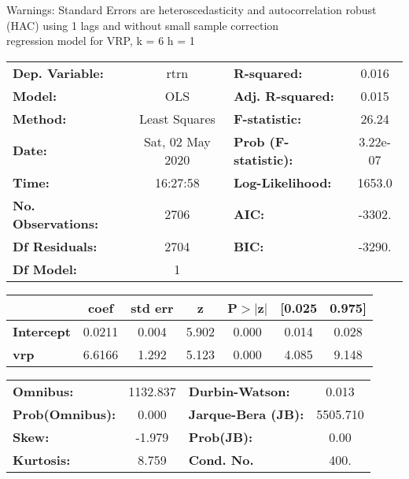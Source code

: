 Warnings: \newline
 [1] Standard Errors are heteroscedasticity and autocorrelation robust (HAC) using 1 lags and without small sample correction\\ 

regression model for VRP, k = 6 h = 1\begin{center}
\begin{tabular}{lclc}
\toprule
\textbf{Dep. Variable:}    &       rtrn       & \textbf{  R-squared:         } &     0.016   \\
\textbf{Model:}            &       OLS        & \textbf{  Adj. R-squared:    } &     0.015   \\
\textbf{Method:}           &  Least Squares   & \textbf{  F-statistic:       } &     26.24   \\
\textbf{Date:}             & Sat, 02 May 2020 & \textbf{  Prob (F-statistic):} &  3.22e-07   \\
\textbf{Time:}             &     16:27:58     & \textbf{  Log-Likelihood:    } &    1653.0   \\
\textbf{No. Observations:} &        2706      & \textbf{  AIC:               } &    -3302.   \\
\textbf{Df Residuals:}     &        2704      & \textbf{  BIC:               } &    -3290.   \\
\textbf{Df Model:}         &           1      & \textbf{                     } &             \\
\bottomrule
\end{tabular}
\begin{tabular}{lcccccc}
                   & \textbf{coef} & \textbf{std err} & \textbf{z} & \textbf{P$> |$z$|$} & \textbf{[0.025} & \textbf{0.975]}  \\
\midrule
\textbf{Intercept} &       0.0211  &        0.004     &     5.902  &         0.000        &        0.014    &        0.028     \\
\textbf{vrp}       &       6.6166  &        1.292     &     5.123  &         0.000        &        4.085    &        9.148     \\
\bottomrule
\end{tabular}
\begin{tabular}{lclc}
\textbf{Omnibus:}       & 1132.837 & \textbf{  Durbin-Watson:     } &    0.013  \\
\textbf{Prob(Omnibus):} &   0.000  & \textbf{  Jarque-Bera (JB):  } & 5505.710  \\
\textbf{Skew:}          &  -1.979  & \textbf{  Prob(JB):          } &     0.00  \\
\textbf{Kurtosis:}      &   8.759  & \textbf{  Cond. No.          } &     400.  \\
\bottomrule
\end{tabular}
\end{center}

